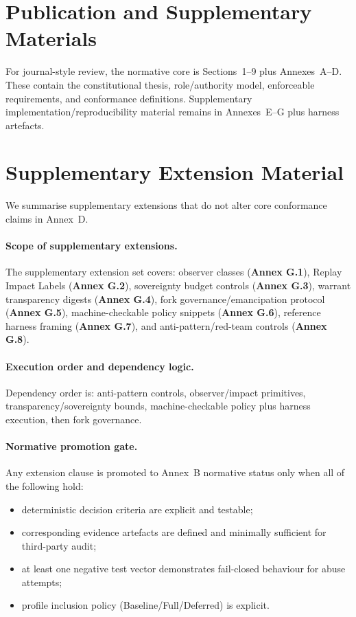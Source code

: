 \documentclass[11pt]{article}
\theoremstyle{definition}
\theoremstyle{plain}
\theoremstyle{remark}
\begin{document}
\section{Publication and Supplementary Materials}
\label{sec:scope-freeze}

For journal-style review, the normative core is Sections~1--9 plus Annexes~A--D.
These contain the constitutional thesis, role/authority model, enforceable requirements, and conformance definitions.
Supplementary implementation/reproducibility material remains in Annexes~E--G plus harness artefacts.

\section{Supplementary Extension Material}
\label{sec:extension-first-pass}

We summarise supplementary extensions that do not alter core conformance claims in Annex~D.

\paragraph{Scope of supplementary extensions.}
The supplementary extension set covers:
observer classes (\textbf{Annex G.1}),
Replay Impact Labels (\textbf{Annex G.2}),
sovereignty budget controls (\textbf{Annex G.3}),
warrant transparency digests (\textbf{Annex G.4}),
fork governance/emancipation protocol (\textbf{Annex G.5}),
machine-checkable policy snippets (\textbf{Annex G.6}),
reference harness framing (\textbf{Annex G.7}),
and anti-pattern/red-team controls (\textbf{Annex G.8}).

\paragraph{Execution order and dependency logic.}
Dependency order is: anti-pattern controls, observer/impact primitives, transparency/sovereignty bounds, machine-checkable policy plus harness execution, then fork governance.

\paragraph{Normative promotion gate.}
Any extension clause is promoted to Annex~B normative status only when all of the following hold:
\begin{itemize}[leftmargin=*]
  \item deterministic decision criteria are explicit and testable;
  \item corresponding evidence artefacts are defined and minimally sufficient for third-party audit;
  \item at least one negative test vector demonstrates fail-closed behaviour for abuse attempts;
  \item profile inclusion policy (Baseline/Full/Deferred) is explicit.
\end{itemize}
\end{document}
